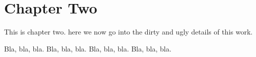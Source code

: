 \chapter{Chapter Two}

This is chapter two. here we now go into the dirty and ugly details
of this work.

Bla, bla, bla. Bla, bla, bla. Bla, bla, bla. Bla, bla, bla.
